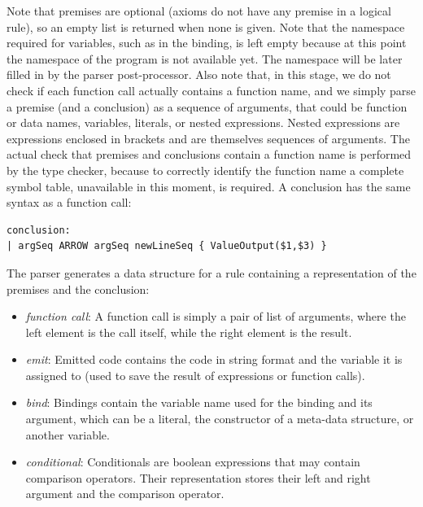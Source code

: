 Note that premises are optional (axioms do not have any premise in a logical rule), so an empty list is returned when none is given. Note that the namespace required for variables, such as in the binding, is left empty because at this point the namespace of the program is not available yet. The namespace will be later filled in by the parser post-processor. Also note that, in this stage, we do not check if each function call actually contains a function name, and we simply parse a premise (and a conclusion) as a sequence of arguments, that could be function or data names, variables, literals, or nested expressions. Nested expressions are expressions enclosed in brackets and are themselves sequences of arguments. The actual check that premises and conclusions contain a function name is performed by the type checker, because to correctly identify the function name a complete symbol table, unavailable in this moment, is required. A conclusion has the same syntax as a function call:

\begin{lstlisting}
conclusion:
| argSeq ARROW argSeq newLineSeq { ValueOutput($1,$3) }
\end{lstlisting}

The parser generates a data structure for a rule containing a representation of the premises and the conclusion:

\begin{itemize}[noitemsep]
\item \textit{function call}: A function call is simply a pair of list of arguments, where the left element is the call itself, while the right element is the result.

\item \textit{emit}: Emitted code contains the code in string format and the variable it is assigned to (used to save the result of expressions or function calls).

\item \textit{bind}: Bindings contain the variable name used for the binding and its argument, which can be a literal, the constructor of a meta-data structure, or another variable.

\item \textit{conditional}: Conditionals are boolean expressions that may contain comparison operators. Their representation stores their left and right argument and the comparison operator.
\end{itemize}

